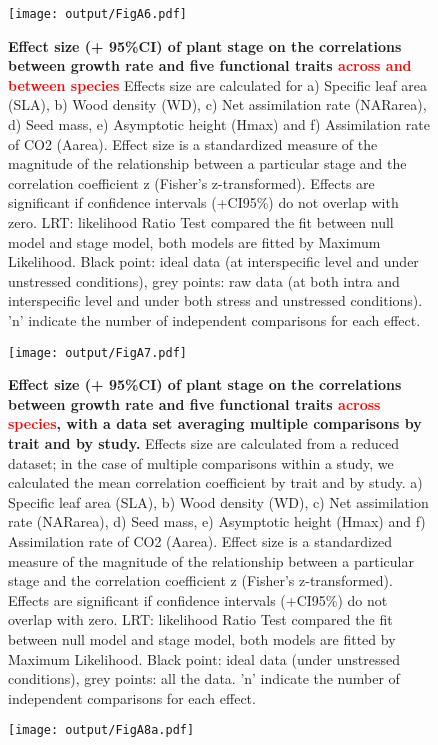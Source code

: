 \documentclass[a4paper]{article}\usepackage[]{graphicx}\usepackage[]{color}
\begin{document}
\begin{appendices}
\begin{figure}[htbp]
\centering
\texttt{[image: output/FigA6.pdf]}
\caption{\textbf{Effect size (+ 95\%CI) of plant stage on the
correlations between growth rate and five functional traits \textcolor{red}{across and between species}} Effects size are calculated for a) Specific leaf area (SLA), b) Wood density (WD), c) Net assimilation rate (NARarea), d) Seed mass, e) Asymptotic height (Hmax) and f) Assimilation rate of CO2 (Aarea). Effect size is a standardized measure of the magnitude of the relationship between a particular stage and the correlation coefficient z (Fisher's z-transformed). Effects are significant if confidence intervals (+CI95\%) do not overlap with zero. LRT: likelihood Ratio Test compared the fit between null model and stage model, both models are fitted by Maximum Likelihood. Black point: ideal data (at interspecific level and under unstressed conditions), grey points: raw data (at both intra and interspecific level and under both stress and unstressed conditions). 'n' indicate the number of independent comparisons for each effect.
}
\label{FigA6}
\end{figure}


\begin{figure}[htbp]
\centering
\texttt{[image: output/FigA7.pdf]}
\caption{\textbf{Effect size (+ 95\%CI) of plant stage on the
correlations between growth rate and five functional traits \textcolor{red}{across species}, with a data set averaging multiple comparisons by trait and by study.} Effects size are calculated from a reduced dataset; in the case of multiple comparisons within a study, we calculated the mean correlation coefficient by trait and by study. a) Specific leaf area (SLA), b) Wood density (WD), c) Net assimilation rate (NARarea), d) Seed mass, e) Asymptotic height (Hmax) and f) Assimilation rate of CO2 (Aarea). Effect size is a standardized measure of the magnitude of the relationship between a particular stage and the correlation coefficient z (Fisher's z-transformed). Effects are significant if confidence intervals (+CI95\%) do not overlap with zero. LRT: likelihood Ratio Test compared the fit between null model and stage model, both models are fitted by Maximum Likelihood. Black point: ideal data (under unstressed conditions), grey points: all the data. 'n' indicate the number of independent comparisons for each effect.}
\label{FigA7}
\end{figure}



\begin{figure}[htbp]
\centering
\texttt{[image: output/FigA8a.pdf]}
\end{figure}


\end{appendices}
\end{document}
